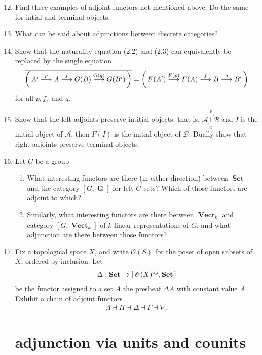\documentclass[12pt,a4paper]{report}
\newcommand{\OP}{{\operatorname{op}}}
\newcommand{\CAT}[1]{\mathscr{#1}}
\newcommand{\CATSET}[1]{\operatorname{\textbf{#1}}}
\newcommand{\MORPHISM}[1]{\overset{#1}\longrightarrow}
\begin{document}
\begin{enumerate}[label=2.1.\arabic*]
\setcounter{enumi}{11}
\item  Find three examples of adjoint functors not mentioned above.  Do the same for intial and terminal objects.

\item What can be said about adjunctions between discrete categories?

\item Show that the naturality equation (2.2) and (2.3) can equivalently be replaced by the single equation 
\begin{align*}
	\CONJ{\PAREN{A'\MORPHISM{p}A\MORPHISM{f}G(B)\MORPHISM{G(q)}G(B')}} = \PAREN{F(A')\MORPHISM{F(p)}F(A)\MORPHISM{\bar{f}}B\MORPHISM{q}B'}
\end{align*}for all $p,f,$ and $q$.

\newcommand{\ADJOINT}[2]{\underset{\underset{#2}\longleftarrow}{\overset{\overset{#1}\longrightarrow}\bot }}


\item Show that the left adjoints preserve intitial objects: that is, $\CAT{A}\ADJOINT{F}{G}\CAT{B}$ and $I$ is the initial object of $\CAT{A}$, then $F(I)$ is the initial object of $\CAT{B}$.  Dually show that right adjoints preserve terminal objects.

\item Let $G$ be a group
\begin{enumerate}[label=(\alph*)]

	\item What interesting functors are there (in either direction) between $\CATSET{Set}$ and the category $[G,\CATSET{G}]$ for left $G$-sets?  Which of those functors are adjoint to which?
	
	\item Similarly, what interesting functors are there between $\CATSET{Vect}_k$ and category $[G,\CATSET{Vect}_k]$ of $k$-linear representations of $G$, and what adjunction are there between those functors?

\end{enumerate}

\item Fix a topological space $X$, and write $\CAT{O}(S)$ for the poset of open subsets of $X$, ordered by inclusion.  Let \begin{align*}
	\Delta:\CATSET{Set}\to \SQBRACKET{\CAT{O}(X)^\OP,\CATSET{Set}}
\end{align*}be the functor assigned to a set $A$ the presheaf $\Delta A$ with constant value $A$.  Exhibit a chain of adjoint functors
\begin{align*}
	\Lambda \dashv \Pi \dashv \Delta \dashv \Gamma \dashv \nabla.
\end{align*}

\section{adjunction via units and counits}

\end{enumerate}
\end{document}
